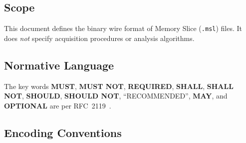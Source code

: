 \documentclass[11pt,a4paper]{article}
\newcommand{\MUST}{\textbf{MUST}}
\newcommand{\MUSTNOT}{\textbf{MUST NOT}}
\newcommand{\SHALL}{\textbf{SHALL}}
\newcommand{\SHALLNOT}{\textbf{SHALL NOT}}
\newcommand{\SHOULD}{\textbf{SHOULD}}
\newcommand{\SHOULDNOT}{\textbf{SHOULD NOT}}
\newcommand{\MAY}{\textbf{MAY}}
\newcommand{\REQUIRED}{\textbf{REQUIRED}}
\newcommand{\OPTIONAL}{\textbf{OPTIONAL}}
\begin{document}
\subsection{Scope}
This document defines the binary wire format of Memory Slice (\texttt{.msl}) files. It does \emph{not} specify acquisition procedures or analysis algorithms.

\subsection{Normative Language}
The key words \MUST, \MUSTNOT, \REQUIRED, \SHALL, \SHALLNOT, \SHOULD, \SHOULDNOT, ``RECOMMENDED'', \MAY, and \OPTIONAL{} are per RFC~2119~\cite{rfc2119}.

\subsection{Encoding Conventions}\label{sec:encoding}
\end{document}
